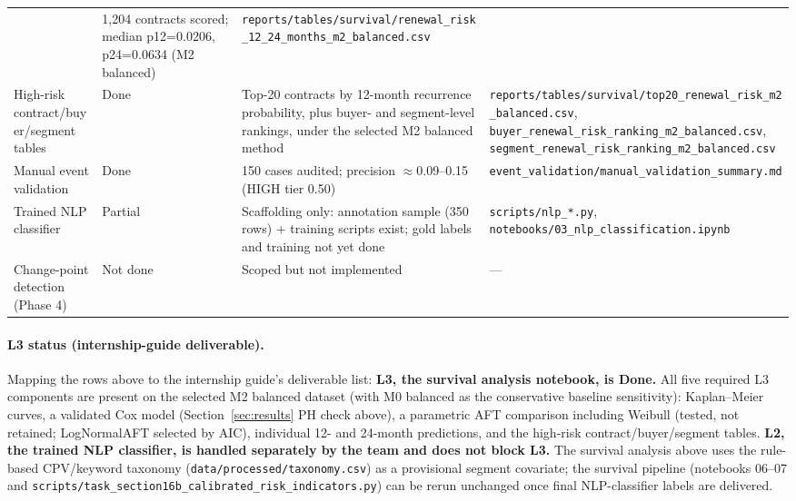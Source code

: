\documentclass[11pt,a4paper]{article}
\begin{document}
\begin{landscape}
\begin{table}[p]
\begin{tabular}{@{}p{4.2cm}p{1.6cm}p{5.4cm}p{10.0cm}@{}}
  & 1,204 contracts scored; median p12=0.0206, p24=0.0634 (M2 balanced)
  & \nolinkurl{reports/tables/survival/renewal_risk_12_24_months_m2_balanced.csv} \\[3pt]
High-risk contract/buyer/segment tables
  & \textcolor{done}{Done}
  & Top-20 contracts by 12-month recurrence probability, plus buyer- and
    segment-level rankings, under the selected M2 balanced method
  & \nolinkurl{reports/tables/survival/top20_renewal_risk_m2_balanced.csv},
    \nolinkurl{buyer_renewal_risk_ranking_m2_balanced.csv},
    \nolinkurl{segment_renewal_risk_ranking_m2_balanced.csv} \\[3pt]
Manual event validation
  & \textcolor{done}{Done}
  & 150 cases audited; precision $\approx$0.09--0.15 (HIGH tier 0.50)
  & \nolinkurl{event_validation/manual_validation_summary.md} \\[3pt]
Trained NLP classifier
  & \textcolor{partial}{Partial}
  & Scaffolding only: annotation sample (350 rows) + training scripts exist; gold labels and training not yet done
  & \nolinkurl{scripts/nlp_*.py}, \nolinkurl{notebooks/03_nlp_classification.ipynb} \\[3pt]
Change-point detection (Phase 4)
  & \textcolor{notdone}{Not done}
  & Scoped but not implemented
  & --- \\
\bottomrule
\end{tabular}
\end{table}
\end{landscape}

\paragraph{L3 status (internship-guide deliverable).} Mapping the rows above
to the internship guide's deliverable list: \textbf{L3, the survival analysis
notebook, is \textcolor{done}{Done}.} All five required L3 components are
present on the selected M2 balanced dataset (with M0 balanced as the
conservative baseline sensitivity): Kaplan--Meier curves, a validated
Cox model (Section~\ref{sec:results} PH check above), a parametric AFT
comparison including Weibull (tested, not retained; LogNormalAFT selected by
AIC), individual 12- and 24-month predictions, and the high-risk
contract/buyer/segment tables. \textbf{L2, the trained NLP classifier, is
handled separately by the team and does not block L3.} The survival analysis
above uses the rule-based CPV/keyword taxonomy
(\nolinkurl{data/processed/taxonomy.csv}) as a provisional segment covariate;
the survival pipeline (notebooks 06--07 and
\nolinkurl{scripts/task_section16b_calibrated_risk_indicators.py}) can be
rerun unchanged once final NLP-classifier labels are delivered.
\end{document}
